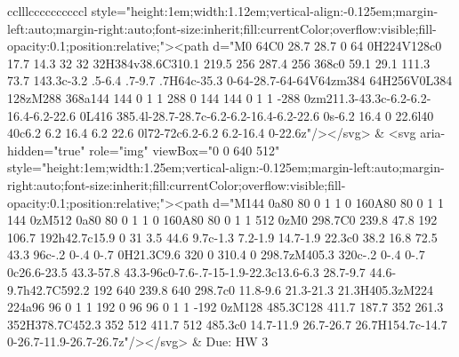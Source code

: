 \documentclass[
]{article}
\begin{document}
\begin{figure*}
\begin{longtable*}{cclllccccccccccl}
style="height:1em;width:1.12em;vertical-align:-0.125em;margin-left:auto;margin-right:auto;font-size:inherit;fill:currentColor;overflow:visible;fill-opacity:0.1;position:relative;"><path d="M0 64C0 28.7 28.7 0 64 0H224V128c0 17.7 14.3 32 32 32H384v38.6C310.1 219.5 256 287.4 256 368c0 59.1 29.1 111.3 73.7 143.3c-3.2 .5-6.4 .7-9.7 .7H64c-35.3 0-64-28.7-64-64V64zm384 64H256V0L384 128zM288 368a144 144 0 1 1 288 0 144 144 0 1 1 -288 0zm211.3-43.3c-6.2-6.2-16.4-6.2-22.6 0L416 385.4l-28.7-28.7c-6.2-6.2-16.4-6.2-22.6 0s-6.2 16.4 0 22.6l40 40c6.2 6.2 16.4 6.2 22.6 0l72-72c6.2-6.2 6.2-16.4 0-22.6z"/></svg> & <svg aria-hidden="true" role="img" viewBox="0 0 640 512" style="height:1em;width:1.25em;vertical-align:-0.125em;margin-left:auto;margin-right:auto;font-size:inherit;fill:currentColor;overflow:visible;fill-opacity:0.1;position:relative;"><path d="M144 0a80 80 0 1 1 0 160A80 80 0 1 1 144 0zM512 0a80 80 0 1 1 0 160A80 80 0 1 1 512 0zM0 298.7C0 239.8 47.8 192 106.7 192h42.7c15.9 0 31 3.5 44.6 9.7c-1.3 7.2-1.9 14.7-1.9 22.3c0 38.2 16.8 72.5 43.3 96c-.2 0-.4 0-.7 0H21.3C9.6 320 0 310.4 0 298.7zM405.3 320c-.2 0-.4 0-.7 0c26.6-23.5 43.3-57.8 43.3-96c0-7.6-.7-15-1.9-22.3c13.6-6.3 28.7-9.7 44.6-9.7h42.7C592.2 192 640 239.8 640 298.7c0 11.8-9.6 21.3-21.3 21.3H405.3zM224 224a96 96 0 1 1 192 0 96 96 0 1 1 -192 0zM128 485.3C128 411.7 187.7 352 261.3 352H378.7C452.3 352 512 411.7 512 485.3c0 14.7-11.9 26.7-26.7 26.7H154.7c-14.7 0-26.7-11.9-26.7-26.7z"/></svg> & Due: HW 3 \\ 

\end{longtable*}
\end{figure*}
\end{document}
